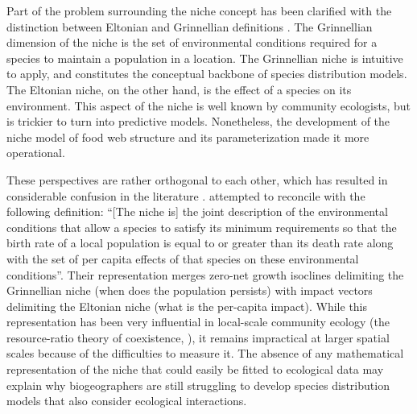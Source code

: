 \documentclass[12pt]{article}
\begin{document}
Part of the problem surrounding the niche concept has been clarified with the
distinction between Eltonian and Grinnellian definitions \citep{Chase2003}. The
Grinnellian dimension of the niche is the set of environmental conditions
required for a species to maintain a population in a location. The Grinnellian
niche is intuitive to apply, and constitutes the conceptual backbone of
species distribution models. The Eltonian niche, on the other hand, is the
effect of a species on its environment. This aspect of the niche is well known
by community ecologists, but is trickier to turn into predictive models.
Nonetheless, the development of the niche model of food web structure
\citep{Williams2000} and its parameterization \citep{Williams2010; Gravel2013}
made it more operational.

These perspectives are rather orthogonal to each other, which has resulted in
considerable confusion in the literature \citep{McInerny2012a}.
\citealt{Chase2003} attempted to reconcile with the following definition:
``[The niche is] the joint description of the environmental conditions that
allow a species to satisfy its minimum requirements so that the birth rate of
a local population is equal to or greater than its death rate along with the
set of per capita effects of that species on these environmental conditions''.
Their representation merges zero-net growth isoclines delimiting the
Grinnellian niche (when does the population persists) with impact vectors delimiting
the Eltonian niche (what is the per-capita impact). While this representation
has been very influential in local-scale community ecology (the resource-ratio
theory of coexistence, \citealt{Tilman1982}), it remains impractical at larger
spatial scales because of the difficulties to measure it. The absence of any
mathematical representation of the niche that could easily be fitted to
ecological data may explain why biogeographers are still struggling to develop
species distribution models that also consider ecological interactions.
\end{document}
